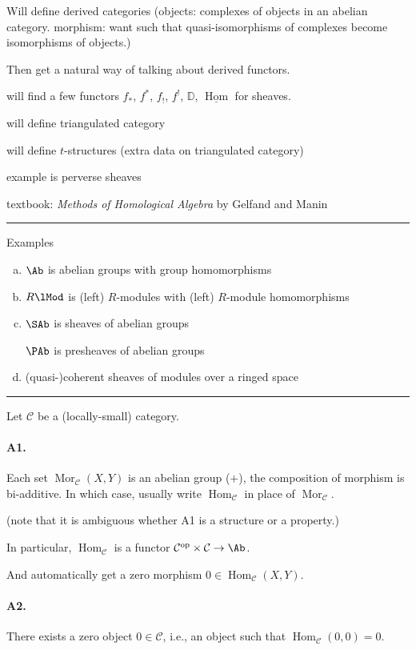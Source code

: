 \documentclass[12pt]{article}
\newcommand{\sepline}{\rule{\textwidth}{0.4pt}}
\theoremstyle{definition}
\newcommand{\D}{\mathbb{D}}
\newcommand{\CC}{\mathcal{C}}
\newcommand{\<}{\left\langle}
\renewcommand{\>}{\right\rangle}
\DeclareMathOperator{\Mor}{Mor}
\DeclareMathOperator{\Hom}{Hom}
\newcommand{\op}{\mathrm{op}}
\newcommand{\udl}{\underline}
\renewcommand{\_}[1]{{_{#1}}}
\begin{document}
Will define derived categories (objects: complexes of objects in an abelian category. morphism: want such that quasi-isomorphisms of complexes become isomorphisms of objects.)

Then get a natural way of talking about derived functors.

will find a few functors $f_*$, $f^*$, $f_!$, $f^!$, $\D$, $\udl{\Hom}$ for sheaves.

will define triangulated category

will define $t$-structures (extra data on triangulated category)

example is perverse sheaves

textbook: \textit{Methods of Homological Algebra} by Gelfand and Manin

\sepline

Examples
\begin{enumerate}[(a)]
    \item $\Ab$ is abelian groups with group homomorphisms
    \item $R\lMod$ is (left) $R$-modules with (left) $R$-module homomorphisms
    \item $\SAb$ is sheaves of abelian groups

    $\PAb$ is presheaves of abelian groups
    \item (quasi-)coherent sheaves of modules over a ringed space
\end{enumerate}

\sepline

Let $\CC$ be a (locally-small) category.

\paragraph{A1.}
Each set $\Mor_\CC(X, Y)$ is an abelian group ($+$), the composition of morphism is bi-additive.
In which case, usually write $\Hom_\CC$ in place of $\Mor_\CC$.

(note that it is ambiguous whether A1 is a structure or a property.)

In particular, $\Hom_\CC$ is a functor $\CC^\op \times \CC \to \Ab$.

And automatically get a zero morphism $0 \in \Hom_\CC(X, Y)$.

\paragraph{A2.}
There exists a zero object $0 \in \CC$, i.e., an object such that $\Hom_\CC(0, 0) = 0$.
\end{document}
